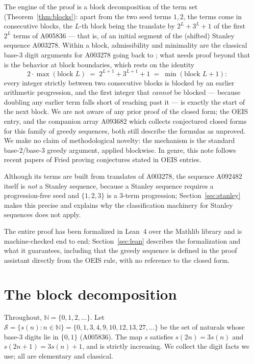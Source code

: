 \documentclass[12pt]{article}
\theoremstyle{plain}
\theoremstyle{definition}
\theoremstyle{remark}
\newcommand{\N}{\mathbb{N}}
\newcommand{\Sd}{\mathcal{S}}
\begin{document}
The engine of the proof is a block decomposition of the term set
(Theorem~\ref{thm:blocks}): apart from the two seed terms $1,2$,
the terms come in consecutive blocks, the $L$-th block being the
translate by $2^L+3^L+1$ of the first $2^L$ terms of A005836 ---
that is, of an initial segment of the (shifted) Stanley sequence
A003278.  Within a block, admissibility and minimality are the
classical base-$3$ digit arguments for A003278 going back to
\cite{OS1978}; what needs proof beyond that is the behavior at
block boundaries, which rests on the identity
\[
2\cdot\max(\text{block } L) \;=\; 2^{L+1}+3^{L+1}+1
\;=\; \min(\text{block } L+1):
\]
every integer strictly between two consecutive blocks is blocked
by an earlier arithmetic progression, and the first integer that
\emph{cannot} be blocked --- because doubling any earlier term
falls short of reaching past it --- is exactly the start of the
next block.  We are not aware of any prior proof of the closed
form; the OEIS entry, and the companion array A093682 which
collects conjectured closed forms for this family of greedy
sequences, both still describe the formulas as unproved.  We make
no claim of methodological novelty: the mechanism is the standard
base-$2$/base-$3$ greedy argument, applied blockwise.  In genre,
this note follows recent papers of Fried
\cite{Fried2024,Fried2026} proving conjectures stated in OEIS
entries.

Although its terms are built from translates of A003278, the
sequence A092482 itself is \emph{not} a Stanley sequence, because
a Stanley sequence requires a progression-free seed and
$\{1,2,3\}$ is a $3$-term progression; Section~\ref{sec:stanley}
makes this precise and explains why the classification machinery
for Stanley sequences does not apply.

The entire proof has been formalized in Lean~4 over the Mathlib
library and is machine-checked end to end;
Section~\ref{sec:lean} describes the formalization and what it
guarantees, including that the greedy sequence is defined in the
proof assistant directly from the OEIS rule, with no reference to
the closed form.

\section{The block decomposition}\label{sec:blocks}

Throughout, $\N=\{0,1,2,\ldots\}$.  Let
$\Sd=\{s(n):n\in\N\}=\{0,1,3,4,9,10,12,13,27,\ldots\}$ be the set
of naturals whose base-$3$ digits lie in $\{0,1\}$ (A005836).
The map $s$ satisfies $s(2n)=3s(n)$ and $s(2n+1)=3s(n)+1$, and is
strictly increasing.  We collect the digit facts we use; all are
elementary and classical.
\end{document}
